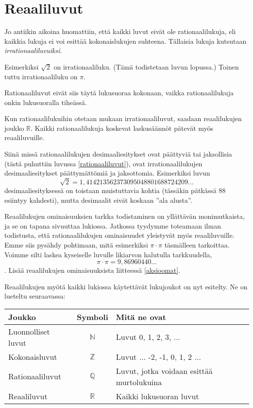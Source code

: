 \chapter{Reaaliluvut}

Jo antiikin aikoina huomattiin, että kaikki luvut eivät ole rationaalilukuja, eli kaikkia lukuja ei voi esittää kokonaislukujen suhteena. Tällaisia lukuja kutsutaan \emph{irrationaaliluvuiksi}.

Esimerkiksi $\sqrt{2}$ on irrationaaliluku. (Tämä todistetaan
luvun lopussa.) Toinen tuttu irrationaaliluku on $\pi$.

Rationaaliluvut eivät siis täytä lukusuoraa kokonaan, vaikka
rationaalilukuja onkin lukusuoralla tiheässä.


Kun rationaalilukuihin otetaan mukaan irrationaaliluvut, saadaan reaalilukujen joukko $\mathbb{R}$. Kaikki rationaalilukuja koskevat
laskusäännöt pätevät myös reaaliluvuille.

Siinä missä rationaalilukujen desimaaliesitykset ovat päättyviä tai jaksollisia (tästä puhuttiin luvussa \ref{rationaaliluvut}), ovat
irrationaalilukujen desimaaliesitykset päättymättömiä ja
jaksottomia. Esimerkiksi luvun
\[\sqrt{2} = 1,414213562373095048801688724209\ldots\]
desimaaliesityksessä on toistaan muistuttavia kohtia
(tässäkin pätkässä 88 esiintyy kahdesti), mutta desimaalit eivät koskaan ''ala alusta''.

Reaalilukujen ominaisuuksien tarkka todistaminen on yllättävän
monimutkaista, ja se on tapana sivuuttaa lukiossa. Jatkossa
tyydymme toteamaan ilman todistusta, että rationaalilukujen
ominaisuudet yleistyvät myös reaaliluvuille.
Emme siis pysähdy pohtimaan, mitä esimerkiksi
$\pi \cdot \pi$ täsmälleen tarkoittaa.
Voimme silti laskea kyseiselle luvulle likiarvon
halutulla tarkkuudella,
\[ \pi\cdot \pi =9,86960440\ldots \].
Lisää reaalilukujen ominaisuuksista liitteessä \ref{aksioomat}.

Reaalilukujen myötä kaikki lukiossa käytettävät lukujoukot on nyt esitelty.
Ne on lueteltu seuraavassa:
\begin{center}\begin{tabular}{l|c|l}
Joukko & Symboli & Mitä ne ovat\\
\hline
Luonnolliset luvut & $\mathbb{N}$ &
Luvut 0, 1, 2, 3, $\ldots$ \\
Kokonaisluvut & $\mathbb{Z}$ & Luvut $\ldots$ -2, -1, 0, 1, 2 $\ldots$ \\
Rationaaliluvut & $\mathbb{Q}$ & Luvut, jotka voidaan esittää
murtolukuina \\
Reaaliluvut & $\mathbb{R}$ & Kaikki lukusuoran luvut
\end{tabular} \end{center}

